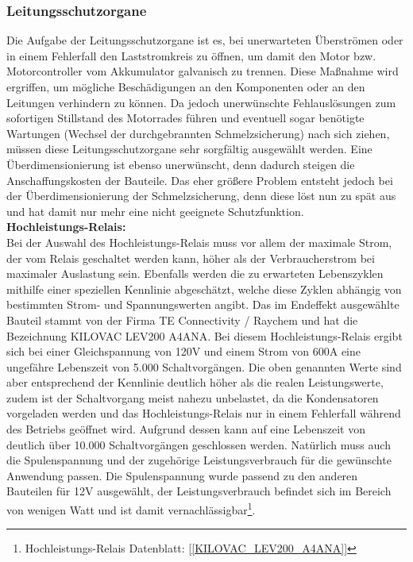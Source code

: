 \newpage



\subsubsection{Leitungsschutzorgane}
\label{Leitungsschutzorgane}
Die Aufgabe der Leitungsschutzorgane ist es, bei unerwarteten Überströmen oder in einem Fehlerfall den Laststromkreis zu öffnen, um damit den Motor bzw. Motorcontroller vom Akkumulator galvanisch zu trennen. Diese Maßnahme wird ergriffen, um mögliche Beschädigungen an den Komponenten oder an den Leitungen verhindern zu können. Da jedoch unerwünschte Fehlauslösungen zum sofortigen Stillstand des Motorrades führen und eventuell sogar benötigte Wartungen (Wechsel der durchgebrannten Schmelzsicherung) nach sich ziehen, müssen diese Leitungsschutzorgane sehr sorgfältig ausgewählt werden. Eine Überdimensionierung ist ebenso unerwünscht, denn dadurch steigen die Anschaffungskosten der Bauteile. Das eher größere Problem entsteht jedoch bei der Überdimensionierung der Schmelzsicherung, denn diese löst nun zu spät aus und hat damit nur mehr eine nicht geeignete Schutzfunktion. 
\\[5mm]

\textbf{Hochleistungs-Relais:}
\\[2mm]
Bei der Auswahl des Hochleistungs-Relais muss vor allem der maximale Strom, der vom Relais geschaltet werden kann, höher als der Verbraucherstrom bei maximaler Auslastung sein. Ebenfalls werden die zu erwarteten Lebenszyklen mithilfe einer speziellen Kennlinie abgeschätzt, welche diese Zyklen abhängig von bestimmten Strom- und Spannungswerten angibt. Das im Endeffekt ausgewählte Bauteil stammt von der Firma \glqq TE Connectivity / Raychem\grqq{} und hat die Bezeichnung \glqq KILOVAC LEV200 A4ANA\grqq{}. Bei diesem Hochleistungs-Relais ergibt sich bei einer Gleichspannung von 120V und einem Strom von 600A eine ungefähre Lebenszeit von 5.000 Schaltvorgängen. Die oben genannten Werte sind aber entsprechend der Kennlinie deutlich höher als die realen Leistungswerte, zudem ist der Schaltvorgang meist nahezu unbelastet, da die Kondensatoren vorgeladen werden und das Hochleistungs-Relais nur in einem Fehlerfall während des Betriebs geöffnet wird. Aufgrund dessen kann auf eine Lebenszeit von deutlich über 10.000 Schaltvorgängen geschlossen werden. Natürlich muss auch die Spulenspannung und der zugehörige Leistungsverbrauch für die gewünschte Anwendung passen. Die Spulenspannung wurde passend zu den anderen Bauteilen für 12V ausgewählt, der Leistungsverbrauch befindet sich im Bereich von wenigen Watt und ist damit vernachlässigbar\footnote{Hochleistungs-Relais Datenblatt: [\ref{KILOVAC_LEV200_A4ANA}]}.
\\[5mm]

